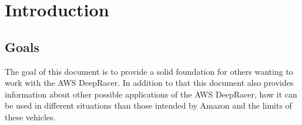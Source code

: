 \chapter{Introduction}
\label{cha:Introduction}

\section{Goals}

The goal of this document is to provide a solid foundation for others wanting to work with the AWS DeepRacer. In addition to that this document also provides information about other possible applications of the AWS DeepRacer, how it can be used in different situations than those intended by Amazon and the limits of these vehicles.



